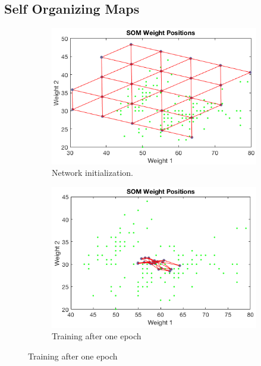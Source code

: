 \documentclass[a4paper, 10pt]{article}
\begin{document}
  \subsection{Self Organizing Maps}
  \begin{figure}[h]
    \begin{adjustwidth}{-1cm}{-1cm}
    \centering
    \begin{subfigure}[t]{0.32\linewidth}
      \includegraphics[width=1\linewidth]{./lab3/SOM/init_hex.png}
      \caption{Network initialization.}
      \label{fig:l3_init}
    \end{subfigure}
    \begin{subfigure}[t]{0.31\linewidth}
      \includegraphics[width=1\linewidth]{./lab3/SOM/epoch1_hex.png}
      \caption{Training after one epoch}

\end{subfigure}
\end{adjustwidth}
\end{figure}
\end{document}
